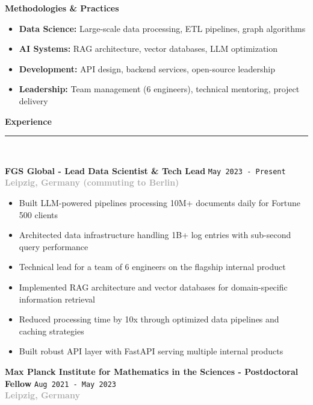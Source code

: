 \documentclass[11pt,a4paper]{article}
\newcommand{\sectiondivider}{%
    \vspace{2pt}\\%
    {\color{verdigris}\rule{30pt}{2pt}}\\%
    \vspace{8pt}%
}
\newcommand{\verdigrisbullet}{{\color{verdigris}$\bullet$}\space}
\newcommand{\jobduration}[1]{%
    \textcolor{mediumgray}{\texttt{\small #1}}%
}
\newcommand{\companyname}[1]{%
    \textcolor{darkgray}{\textbf{#1}}%
}
\newcommand{\cvsectioncustom}[1]{%
    \vspace{12pt}%
    {\Large\color{navy}\textbf{#1}}%
    \sectiondivider%
}
\begin{document}
\vspace{6pt}
\textbf{Methodologies \& Practices}
\begin{itemize}[leftmargin=15pt,itemsep=2pt]
    \item[\verdigrisbullet] \textbf{Data Science:} Large-scale data processing, ETL pipelines, graph algorithms
    \item[\verdigrisbullet] \textbf{AI Systems:} RAG architecture, vector databases, LLM optimization
    \item[\verdigrisbullet] \textbf{Development:} API design, backend services, open-source leadership
    \item[\verdigrisbullet] \textbf{Leadership:} Team management (6 engineers), technical mentoring, project delivery
\end{itemize}

\cvsectioncustom{Experience}

\textbf{\large\color{navy}FGS Global - Lead Data Scientist \& Tech Lead} \hfill \jobduration{May 2023 - Present}\\
\companyname{Leipzig, Germany (commuting to Berlin)}

\begin{itemize}[leftmargin=15pt,itemsep=3pt]
    \item[\verdigrisbullet] Built LLM-powered pipelines processing 10M+ documents daily for Fortune 500 clients
    \item[\verdigrisbullet] Architected data infrastructure handling 1B+ log entries with sub-second query performance
    \item[\verdigrisbullet] Technical lead for a team of 6 engineers on the flagship internal product
    \item[\verdigrisbullet] Implemented RAG architecture and vector databases for domain-specific information retrieval
    \item[\verdigrisbullet] Reduced processing time by 10x through optimized data pipelines and caching strategies
    \item[\verdigrisbullet] Built robust API layer with FastAPI serving multiple internal products
\end{itemize}

\vspace{8pt}

\textbf{\large\color{navy}Max Planck Institute for Mathematics in the Sciences - Postdoctoral Fellow} \hfill \jobduration{Aug 2021 - May 2023}\\
\companyname{Leipzig, Germany}
\end{document}
